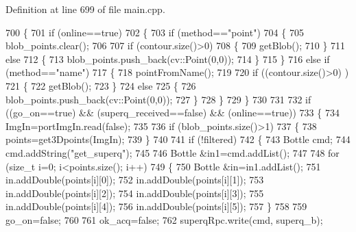 Definition at line 699 of file main.\+cpp.


\begin{DoxyCode}
700     \{
701         \textcolor{keywordflow}{if} (online==\textcolor{keyword}{true})
702         \{
703             \textcolor{keywordflow}{if} (method==\textcolor{stringliteral}{"point"})
704             \{
705                 blob\_points.clear();
706 
707                 \textcolor{keywordflow}{if} (contour.size()>0)
708                 \{
709                     getBlob();
710                 \}
711                 \textcolor{keywordflow}{else}
712                 \{
713                     blob\_points.push\_back(cv::Point(0,0));
714                 \}
715             \}
716             \textcolor{keywordflow}{else} \textcolor{keywordflow}{if} (method==\textcolor{stringliteral}{"name"})
717             \{
718                 pointFromName();
719 
720                 \textcolor{keywordflow}{if} ((contour.size()>0) )
721                 \{
722                     getBlob();
723                 \}
724                 \textcolor{keywordflow}{else}
725                 \{
726                     blob\_points.push\_back(cv::Point(0,0));
727                 \}
728             \}
729         \}
730 
731         
732         \textcolor{keywordflow}{if} ((go\_on==\textcolor{keyword}{true}) && (superq\_received==\textcolor{keyword}{false}) && (online==\textcolor{keyword}{true}))
733         \{
734             ImgIn=portImgIn.read(\textcolor{keyword}{false});
735 
736             \textcolor{keywordflow}{if} (blob\_points.size()>1)
737             \{
738                 points=get3Dpoints(ImgIn);           
739             \}
740 
741             \textcolor{keywordflow}{if} (!filtered)
742             \{
743                 Bottle cmd;
744                 cmd.addString(\textcolor{stringliteral}{"get\_superq"});
745 
746                 Bottle &in1=cmd.addList();
747 
748                 \textcolor{keywordflow}{for} (\textcolor{keywordtype}{size\_t} i=0; i<points.size(); i++)
749                 \{
750                     Bottle &in=in1.addList();
751                     in.addDouble(points[i][0]);
752                     in.addDouble(points[i][1]);
753                     in.addDouble(points[i][2]);
754                     in.addDouble(points[i][3]);
755                     in.addDouble(points[i][4]);
756                     in.addDouble(points[i][5]);
757                 \}
758 
759                 go\_on=\textcolor{keyword}{false};
760 
761                 ok\_acq=\textcolor{keyword}{false};
762                 superqRpc.write(cmd, superq\_b);

\end{DoxyCode}
